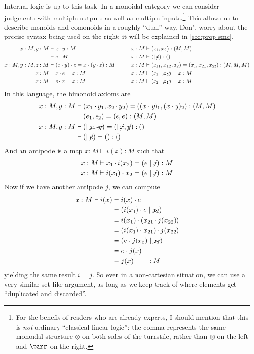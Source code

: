 \documentclass{book}
\let\types\vdash
\let\tensor\otimes
\begin{document}
Internal logic is up to this task.
In a monoidal category we can consider judgments with multiple outputs as well as multiple inputs.\footnote{For the benefit of readers who are already experts, I should mention that this is \emph{not} ordinary ``classical linear logic'': the comma represents the same monoidal structure $\tensor$ on both sides of the turnstile, rather than $\tensor$ on the left and $\parr$ on the right.}
This allows us to describe monoids and comonoids in a roughly ``dual'' way.
Don't worry about the precise syntax being used on the right; it will be explained in \cref{sec:prop-smc}.
\begin{alignat*}{2}
  x:M, y:M &\types x\cdot y:M &\qquad x:M &\types (x_1,x_2):(M,M)\\
  &\types e:M &\qquad x:M &\types (\mid\cancel{x}):()\\
  x:M,y:M,z:M &\types (x\cdot y)\cdot z = x\cdot (y\cdot z) :M &\qquad x:M &\types (x_{11},x_{12},x_2)=(x_1,x_{21},x_{22}):(M,M,M)\\
  x:M &\types x\cdot e=x:M &\qquad x:M &\types (x_1\mid\cancel{x_2}) = x:M\\
  x:M &\types e\cdot x=x:M &\qquad x:M &\types (x_2\mid\cancel{x_1}) = x:M
\end{alignat*}
In this language, the bimonoid axioms are
\begin{align*}
  x:M,y:M &\types (x_1\cdot y_1,x_2\cdot y_2) = ((x\cdot y)_1,(x\cdot y)_2) :(M,M)\\
          &\types (e_1,e_2)=(e,e):(M,M)\\
  x:M,y:M &\types (\mid\cancel{x\cdot y}) = (\mid\cancel{x},\cancel{y}) : ()\\
  &\types (\mid\cancel{e})=():()
\end{align*}
And an antipode is a map $x:M \types i(x):M$ such that
\begin{align*}
  x:M &\types x_1\cdot i(x_2) = (e\mid\cancel{x}) :M\\
  x:M &\types i(x_1)\cdot x_2 = (e\mid\cancel{x}) :M
\end{align*}
Now if we have another antipode $j$, we can compute
\begin{align*}
  x:M \types i(x)
  &= i(x)\cdot e\\
  &= (i(x_1)\cdot e\mid\cancel{x_2})\\
  &= i(x_1)\cdot (x_{21} \cdot j(x_{22}))\\
  &= (i(x_1)\cdot x_{21}) \cdot j(x_{22})\\
  &= (e \cdot j(x_{2})\mid\cancel{x_1})\\
  &= e\cdot j(x)\\
  &= j(x) \qquad :M
\end{align*}
yielding the same result $i=j$.
So even in a non-cartesian situation, we can use a very similar set-like argument, as long as we keep track of where elements get ``duplicated and discarded''.
\end{document}

